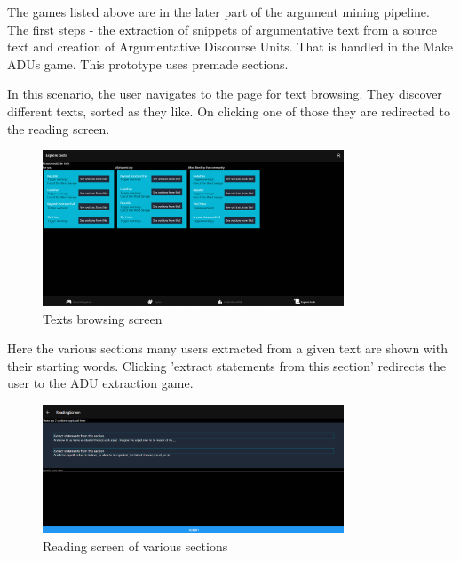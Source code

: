 \documentclass{report}
\begin{document}
The games listed above are in the later part of the argument mining pipeline. The first steps - the extraction of snippets of argumentative text from a source text and creation of Argumentative Discourse Units. That is handled in the Make ADUs game. This prototype uses premade sections. 

In this scenario, the user navigates to the page for text browsing. They discover different texts, sorted as they like. On clicking one of those they are redirected  to the reading screen.

\begin{figure}[h]
    \centering
    \includegraphics[width=0.8\textwidth]{./images/browse-texts.png}
    \caption{Texts browsing screen}
\end{figure}

Here the various sections many users extracted from a given text are shown with their starting words. Clicking 'extract statements from this section' redirects the user to the ADU extraction game.
\begin{figure}[h]
    \centering
    \includegraphics[width=0.8\textwidth]{./images/reading-screen.png}
    \caption{Reading screen of various sections}
\end{figure}
\end{document}

